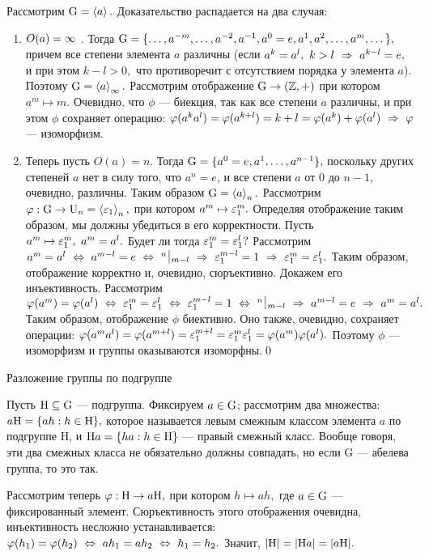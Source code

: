 \dok Рассмотрим ${\rm G}=\left\langle a\right\rangle.$ Доказательство распадается {на} два случая:
\begin{enumerate}
    \item $O(a)=\infty$ . Тогда ${\rm G}=\{\dots,a^{-m},\dots,a^{-2},a^{-1},a^0=e,a^1,a^2,\dots,a^m,\dots\},$ причем все
    степени элемента $a$ различны (если $a^k=a^l,\ k>l\ \Rightarrow\  a^{k-l}=e,$ и при этом $k-l>0,$ что противоречит с отсутствием
    порядка у элемента $a$). Поэтому ${\rm G}=\left\langle a\right\rangle_\infty.$ Рассмотрим отображение ${\rm G} \rightarrow (\mathbb Z,+)$ при котором
    $a^m\mapsto m.$ Очевидно, что $\phi$ --- биекция, так как все степени $a$ различны, и при этом $\phi$ сохраняет операцию:
    $\varphi(a^ka^l)=\varphi(a^{k+l})=k+l=\varphi(a^k)+\varphi(a^l)\ \Rightarrow\ \varphi$ --- изоморфизм.
    \item Теперь пусть $O(a)=n.$ Тогда ${\rm G}=\{a^0=e,a^1,\dots,a^{n-1}\},$ поскольку других степеней $a$ нет в силу того, что
    $a^n=e$, и все степени $a$ от $0$ до $n-1$, очевидно, различны. Таким образом ${\rm G}=\left\langle a\right\rangle_n.$ Рассмотрим $\varphi : {\rm G}\rightarrow{\rm U}_n=\left\langle\varepsilon_1\right\rangle_n,$
    при котором $a^m\mapsto \varepsilon_1^m.$ Определяя отображение таким образом, мы должны убедиться в его корректности. Пусть
    $a^m\mapsto \varepsilon_1^m,\ a^m=a^l.$ Будет ли тогда $\varepsilon_1^m=\varepsilon^l_1?$ Рассмотрим $a^m=a^l\lra a^{m-l}=e\lra{}^n\,\vrule\,_{m-l}\ra
    \eps_1^{m-l}=1\ra{\eps_1^m=\eps_1^l.}$ Таким образом, отображение корректно и, очевидно, сюръективно. Докажем его
    инъективность. Рассмотрим $\phi(a^m)=\phi(a^l)\lra\eps_1^m=\eps_1^l\lra\eps_1^{m-l}=1\lra{}^n\,\vrule\,_{m-l}\ra a^{m-l}=e\ra a^m=a^l.$
    Таким образом, отображение $\phi$ биективно. Оно также, очевидно, сохраняет операции: $\varphi(a^ma^l)=\varphi(a^{m+l})=\varepsilon_1^{m+l}=
    \varepsilon_1^m\varepsilon_1^l=\varphi(a^m)\varphi(a^l).$ Поэтому $\phi$ --- изоморфизм и группы оказываются изоморфны.\quad\qed
\end{enumerate}
\centerline{Разложение группы по подгруппе}\medskip

Пусть ${\rm H}\subseteq{\rm G}$ --- подгруппа. Фиксируем $a\in {\rm G}$; рассмотрим два множества: $a{\rm H}=\{ah : h\in{\rm H}\},$ которое называется
левым смежным классом элемента $a$ по подгруппе \mr H, и ${\rm H}a=\{ha : h\in{\rm H}\}$ --- правый смежный класс. Вообще говоря,
эти два смежных класса не обязательно должны совпадать, но если \mr G --- абелева группа, то это так.

Рассмотрим теперь $\varphi : {\rm H}\rightarrow a{\rm H},$ при котором $h\mapsto ah,$ где $a\in{\rm G}$ --- фиксированный элемент. Сюръективность
этого отображения очевидна, инъективность несложно устанавливается: $\varphi(h_1)=\varphi(h_2)\ \Leftrightarrow\  ah_1=ah_2\ \Leftrightarrow\  h_1=h_2.$ Значит,
$|{\rm H}|=|{\rm H}a|=|a{\rm H}|.$

